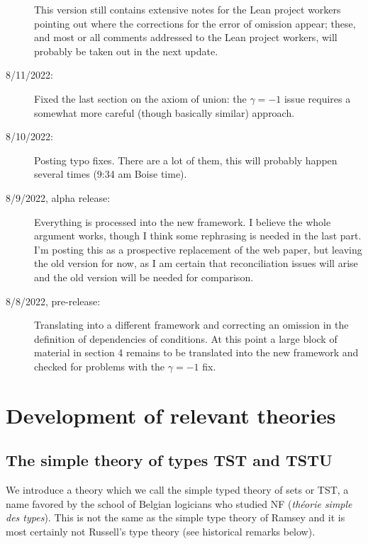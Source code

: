\documentclass[112pt]{article}
\begin{document}
\begin{description}
This version still contains extensive notes for the Lean project workers pointing out where the corrections for the error of omission appear;  these, and most or all comments addressed to the Lean project workers, will probably be taken out in the next update.

\item[8/11/2022:]  Fixed the last section on the axiom of union:  the $\gamma= -1$ issue requires a somewhat more careful (though basically similar) approach.

\item[8/10/2022:]  Posting typo fixes.  There are a lot of them, this will probably happen several times (9:34 am Boise time).

\item[8/9/2022, alpha release:]  Everything is processed into the new framework.  I believe the whole argument works, though I think some rephrasing is needed in the last part.  I'm posting this as a prospective replacement of the web paper, but leaving the old version for now, as I am certain that reconciliation issues will arise
and the old version will be needed for comparison.

\item[8/8/2022, pre-release:]  Translating into a different framework and correcting an omission in the definition of dependencies of conditions.  At this point a large block of material in section 4 remains to be translated into the new framework and checked for problems with the $\gamma = -1$ fix.

\end{description}


\section{Development of relevant theories}

\subsection{The simple theory of types TST and TSTU}

We introduce a theory which we call the simple typed theory of sets or TST, a name favored by the school of Belgian logicians who studied NF ({\em th\'eorie simple des types}).  This is not the same as the simple type theory of Ramsey and it is most certainly not Russell's type theory  (see historical remarks below).
\end{document}
